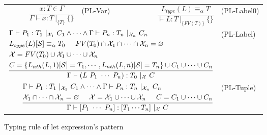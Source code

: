 \documentclass{article}
\begin{document}
\begin{figure}
    \centering
    \begin{tabular}{rlrl}
        $\dfrac{x : T \in \Gamma}{\Gamma \vdash x : T\ |_{\{T\}}\ \{\}}$ & (PL-Var) &
        $\dfrac{L_{type}(L) \equiv_\alpha T}{\vdash L : T\ |_{\{FV(T)\}}\ \{\}}$ & (PL-Label0) \vspace{5mm} \\

        \multicolumn{3}{r}{
        $\dfrac{
        \begin{aligned}
        &\Gamma \vdash P_1 : T_1\ |_{\mathcal{X}_1}\ C_1 \land \cdots \land
        \Gamma \vdash P_n : T_n\ |_{\mathcal{X}_n}\ C_n \\
        &L_{type}(L)[\mathcal{S}]\equiv_\alpha T_0 \hspace{5mm} FV(T_0) \cap \mathcal{X}_1 \cap \cdots \cap \mathcal{X}_n = \varnothing \\
        &\mathcal{X} = FV(T_0) \cup \mathcal{X}_1 \cup \cdots \cup \mathcal{X}_n \\
        &C = \{L_{nth}(L, 1)[\mathcal{S}] = T_1, \cdots, L_{nth}(L, n)[\mathcal{S}] = T_n\} \cup C_1 \cup \cdots \cup C_n
        \end{aligned}
        }{\Gamma \vdash (L\ P_1\ \cdots\ P_n) : T_0\ |_{\mathcal{X}}\ C}$} & (PL-Label) \vspace{5mm} \\

        \multicolumn{3}{r}{
        $\dfrac{
        \begin{aligned}
        &\Gamma \vdash P_1 : T_1\ |_{\mathcal{X}_1}\ C_1 \land \cdots \land
        \Gamma \vdash P_n : T_n\ |_{\mathcal{X}_n}\ C_n \\
        &\mathcal{X}_1 \cap \cdots \cap \mathcal{X}_n = \varnothing \hspace{5mm}
        \mathcal{X} = \mathcal{X}_1 \cup \cdots \cup \mathcal{X}_n \hspace{5mm}
        C = C_1 \cup \cdots \cup C_n
        \end{aligned}
        }{\Gamma \vdash [P_1\ \cdots\ P_n] : [T_1 \cdots T_n]\ |_{\mathcal{X}}\ C}$} & (PL-Tuple) \\
    \end{tabular}
    \caption{Typing rule of let expression's pattern}
\end{figure}
\end{document}
